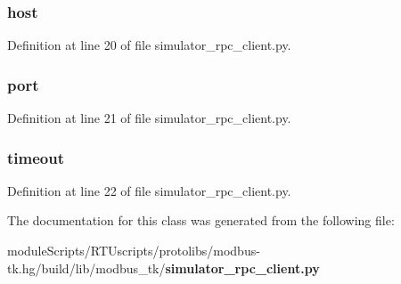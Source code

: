\subsubsection[{host}]{\setlength{\rightskip}{0pt plus 5cm}host}\label{classmodbus__tk_1_1simulator__rpc__client_1_1_simulator_rpc_client_a832ddc04754e8a43d4f3c6165b1294a7}


Definition at line 20 of file simulator\+\_\+rpc\+\_\+client.\+py.

\subsubsection[{port}]{\setlength{\rightskip}{0pt plus 5cm}port}\label{classmodbus__tk_1_1simulator__rpc__client_1_1_simulator_rpc_client_af8fb0f45ee0195c7422a49e6a8d72369}


Definition at line 21 of file simulator\+\_\+rpc\+\_\+client.\+py.

\subsubsection[{timeout}]{\setlength{\rightskip}{0pt plus 5cm}timeout}\label{classmodbus__tk_1_1simulator__rpc__client_1_1_simulator_rpc_client_aee145bfca8e9b2eaf3cd3c47157be9a3}


Definition at line 22 of file simulator\+\_\+rpc\+\_\+client.\+py.



The documentation for this class was generated from the following file\+:\begin{DoxyCompactItemize}
\item 
module\+Scripts/\+R\+T\+Uscripts/protolibs/modbus-\/tk.\+hg/build/lib/modbus\+\_\+tk/{\bf simulator\+\_\+rpc\+\_\+client.\+py}\end{DoxyCompactItemize}
